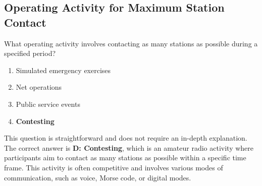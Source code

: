 \subsection{Operating Activity for Maximum Station Contact}
\label{T8C03}

\begin{tcolorbox}[colback=gray!10!white,colframe=black!75!black,title=T8C03]
What operating activity involves contacting as many stations as possible during a specified period?
\begin{enumerate}[noitemsep]
    \item Simulated emergency exercises
    \item Net operations
    \item Public service events
    \item \textbf{Contesting}
\end{enumerate}
\end{tcolorbox}

This question is straightforward and does not require an in-depth explanation. The correct answer is \textbf{D: Contesting}, which is an amateur radio activity where participants aim to contact as many stations as possible within a specific time frame. This activity is often competitive and involves various modes of communication, such as voice, Morse code, or digital modes.